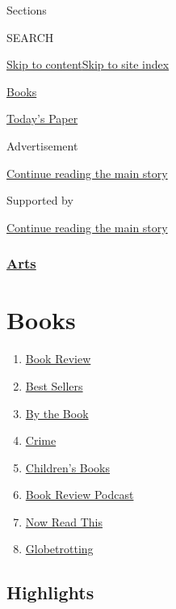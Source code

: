 Sections

SEARCH

\protect\hyperlink{site-content}{Skip to
content}\protect\hyperlink{site-index}{Skip to site index}

\href{https://www.nytimes.com/section/books}{Books}

\href{https://myaccount.nytimes.com/auth/login?response_type=cookie\&client_id=vi}{}

\href{https://www.nytimes.com/section/todayspaper}{Today's Paper}

Advertisement

\protect\hyperlink{after-top}{Continue reading the main story}

Supported by

\protect\hyperlink{after-sponsor}{Continue reading the main story}

\hypertarget{arts}{%
\subsubsection{\texorpdfstring{\href{arts}{Arts}}{Arts}}\label{arts}}

\hypertarget{books}{%
\section{Books}\label{books}}

\begin{enumerate}
\def\labelenumi{\arabic{enumi}.}
\tightlist
\item
  \href{/section/books/review}{Book Review}
\item
  \href{/books/best-sellers/}{Best Sellers}
\item
  \href{/column/by-the-book}{By the Book}
\item
  \href{/column/crime}{Crime}
\item
  \href{/column/childrens-books}{Children's Books}
\item
  \href{/column/book-review-podcast}{Book Review Podcast}
\item
  \href{/spotlight/now-read-this}{Now Read This}
\item
  \href{/interactive/2020/01/08/books/new-books-international.html}{Globetrotting}
\end{enumerate}

\hypertarget{highlights}{%
\subsection{Highlights}\label{highlights}}

